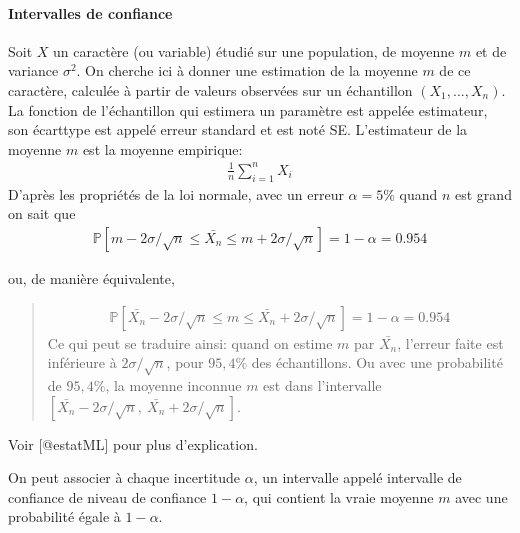 \documentclass[letterpaper,11pt,english]{sphinxmanual}
\begin{document}
\paragraph{Intervalles de confiance}
\label{\detokenize{chapter2:intervalles-de-confiance}}
\sphinxAtStartPar
Soit \(X\) un caractère (ou variable) étudié sur une population, de
moyenne \(m\) et de variance \(\sigma^2\). On cherche ici à
donner une estimation de la moyenne \(m\) de ce caractère, calculée
à partir de valeurs observées sur un échantillon
\((X_1, ..., X_n)\). La fonction de l’échantillon qui estimera un
paramètre est appelée estimateur, son écart\sphinxhyphen{}type est appelé erreur
standard et est noté SE. L’estimateur de la moyenne \(m\) est la
moyenne empirique:
\begin{equation}\label{equation:chapter2:chapter2:55}
\begin{split}\frac{1}{n}\sum_{i=1}^{n} X_i\end{split}
\end{equation}
\sphinxAtStartPar
D’après les propriétés de la loi normale, avec un erreur
\(\alpha = 5\%\) quand \(n\) est grand on sait que
\begin{equation}\label{equation:chapter2:chapter2:56}
\begin{split}\mathbb{P}\left[m-2\sigma/ \sqrt{n}\leq \bar{X_n}\leq m+2\sigma/ \sqrt{n}\right] = 1- \alpha = 0.954\end{split}
\end{equation}
\begin{DUlineblock}{0em}
\item[] ou, de manière équivalente,
\end{DUlineblock}
\begin{quote}
\begin{equation}\label{equation:chapter2:chapter2:57}
\begin{split}\mathbb{P}\left[\bar{X_n}-2\sigma/ \sqrt{n}\leq m\leq \bar{X_n}+2\sigma/ \sqrt{n}\right] = 1- \alpha = 0.954\end{split}
\end{equation}
\sphinxAtStartPar
Ce qui peut se traduire ainsi: quand on estime \(m\) par
\(\bar{X_n}\), l’erreur faite est inférieure à
\(2\sigma/ \sqrt{n}\), pour \(95,4\%\) des échantillons. Ou
avec une probabilité de \(95,4\%\), la moyenne inconnue \(m\)
est dans l’intervalle
\(\left[\bar{X_n}-2\sigma/ \sqrt{n},\ \bar{X_n}+2\sigma/ \sqrt{n}\right]\).
\end{quote}

\begin{DUlineblock}{0em}
\item[] Voir {[}@estatML{]} pour plus d’explication.
\item[] 
\item[] On peut associer à chaque incertitude \(\alpha\), un intervalle
appelé intervalle de confiance de niveau de confiance
\(1 - \alpha\), qui contient la vraie moyenne \(m\) avec une
probabilité égale à \(1 - \alpha\).
\end{DUlineblock}
\end{document}
